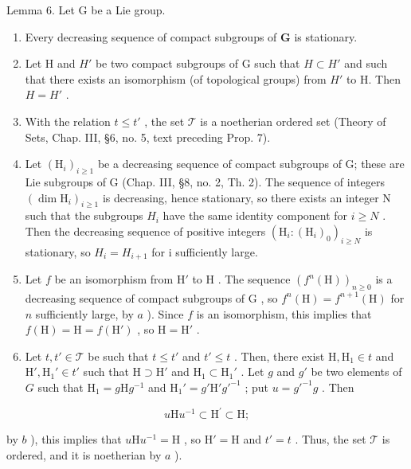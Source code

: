 Lemma 6. Let G be a Lie group.

\begin{enumerate}
\def\labelenumi{\alph{enumi})}
\item
  Every decreasing sequence of compact subgroups of \(\mathbf{G}\) is stationary.
\item
  Let H and \(H'\) be two compact subgroups of G such that \(H \subset H'\) and such that there exists an isomorphism (of topological groups) from \(H'\) to H. Then \(H = H'\) .
\item
  With the relation \(t \leq t'\) , the set \(\mathcal{T}\) is a noetherian ordered set (Theory of Sets, Chap. III, §6, no. 5, text preceding Prop. 7).
\item
  Let \((\mathrm{H}_{i})_{i\geq1}\) be a decreasing sequence of compact subgroups of G; these are Lie subgroups of G (Chap. III, §8, no. 2, Th. 2). The sequence of integers \((\dim\mathrm{H}_{i})_{i\geq1}\) is decreasing, hence stationary, so there exists an integer N such that the subgroups \(H_{i}\) have the same identity component for \(i\geq N\) . Then the decreasing sequence of positive integers \((\mathrm{H}_{i}:(\mathrm{H}_{i})_{0})_{i\geq N}\) is stationary, so \(H_{i}=H_{i+1}\) for i sufficiently large.
\item
  Let \(f\) be an isomorphism from \(\mathrm{H}'\) to \(\mathrm{H}\) . The sequence \((f^n(\mathrm{H}))_{n\geq 0}\) is a decreasing sequence of compact subgroups of \(\mathrm{G}\) , so \(f^n(\mathrm{H}) = f^{n + 1}(\mathrm{H})\) for \(n\) sufficiently large, by \(a\) ). Since \(f\) is an isomorphism, this implies that \(f(\mathrm{H}) = \mathrm{H} = f(\mathrm{H}')\) , so \(\mathrm{H} = \mathrm{H}'\) .
\item
  Let \(t, t' \in \mathcal{T}\) be such that \(t \leq t'\) and \(t' \leq t\) . Then, there exist \(\mathrm{H}, \mathrm{H}_1 \in t\) and \(\mathrm{H}', \mathrm{H}_1' \in t'\) such that \(\mathrm{H} \supset \mathrm{H}'\) and \(\mathrm{H}_1 \subset \mathrm{H}_1'\) . Let \(g\) and \(g'\) be two elements of \(G\) such that \(\mathrm{H}_1 = g\mathrm{H}g^{-1}\) and \(\mathrm{H}_1' = g'\mathrm{H}'g'^{-1}\) ; put \(u = g'^{-1}g\) . Then
\end{enumerate}

\[
u \mathrm{H} u ^ {- 1} \subset \mathrm{H} ^ {\prime} \subset \mathrm{H};
\]

by \(b\) ), this implies that \(u\mathrm{H}u^{-1} = \mathrm{H}\) , so \(\mathrm{H}' = \mathrm{H}\) and \(t' = t\) . Thus, the set \(\mathcal{T}\) is ordered, and it is noetherian by \(a\) ).

